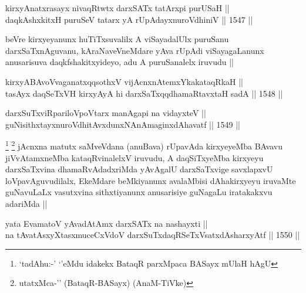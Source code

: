 

\begin{shl}
kirxyAnatxrasayx nivaqRtwtx darxSATx tatArxpi purUSaH || \\
daqkAshxkitxH puruSeV tatarx yA rUpAdayxnuroVdhiniV ||  1547 ||  
\end{shl}

\begin{artha}
beVre kirxyeyanunx huTiTxsuvalilx A viSayadalUlx puruSanu darxSaTxnAguvanu, kAraNaveVneMdare yAva rUpAdi viSayagaLanunx anusarisuva daqkfshakitxyideyo, adu A puruSanalelx iruvudu ||
\end{artha}



\begin{shl}
kirxyABAvoV\s vaganatxqqsothxV vijAcnxnAtemxYkakataqRkaH || \\
tasAyx daqSeTxVH kirxyAyA hi darxSaTxqqdhamaRtavxtaH sadA ||  1548 ||  
\end{shl}
				
\begin{shl}
darxSuTxviRpariloVpoV\s tarx manAgapi na vidayxteV || \\
guNisithxtayxnuroVdhitAvxdunxNAnAmaginxdAhavatf ||  1549 ||  
\end{shl}

\begin{artha}
\footnote{`tadAhu:-' `\stext'eMdu idakekx BataqR parxMpaca BASayx mUlaH hAgU}
\footnote{utatxMca-'\stext' (BataqR-BASayx) (AnaM-TiVke)}
jAcnxna matutx saMveVdana (anuBava) rUpavAda kirxyeyeMba BAvavu jiVvAtamxneMba kataqRvinalelxV iruvudu, A daqSiTxyeMba kirxyeyu darxSaTxvina dhamaRvAdadxriMda yAvAgalU darxSaTxvige savxlapxvU loVpavAguvudilalx, EkeMdare beMkiyanunx avalaMbisi dAhakirxyeyu iruvaMte guNavuLaLx vasutxvina sithxtiyanunx anusarisiye guNagaLu iratakakxvu adariMda ||
\end{artha}

\begin{shl}
yata EvamatoV yAvadAtAmx darxSATx na nashayxti || \\
na tAvatAsxyXtasxmuceCxVdoV darxSuTxdaqRSeTxVsatxdAsharxyAtf ||  1550 ||  
\end{shl}

